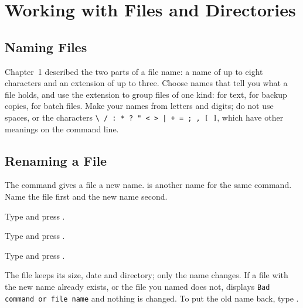 \chapter{Working with Files and Directories}

\section{Naming Files}
Chapter~1 described the two parts of a file name: a name of up to eight
characters and an extension of up to three.  Choose names that tell you
what a file holds, and use the extension to group files of one kind:
 for text,  for backup copies,  for batch
files.  Make your names from letters and digits; do not use spaces, or the
characters \texttt{\textbackslash{} / : * ? " < > | + = ; , [ ]}, which have
other meanings on the command line.

\section{Renaming a File}
The  command gives a file a new name.   is another
name for the same command.  Name the file first and the new name second.
\begin{Steps}
\item Type  and press .
\item Type  and press .
\item Type  and press .
\end{Steps}


The file keeps its size, date and directory; only the name changes.  If a
file with the new name already exists, or the file you named does not,
 displays \texttt{Bad command or file name} and nothing is
changed.  To put the old name back, type .

